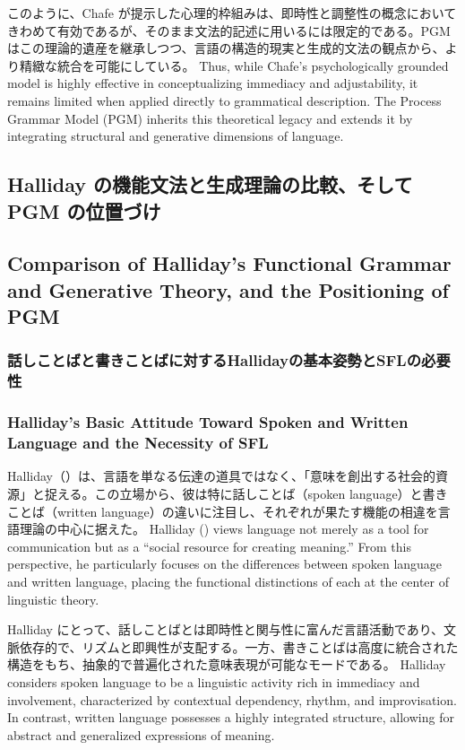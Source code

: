 \ifJPN
このように、Chafe が提示した心理的枠組みは、即時性と調整性の概念においてきわめて有効であるが、そのまま文法的記述に用いるには限定的である。PGM はこの理論的遺産を継承しつつ、言語の構造的現実と生成的文法の観点から、より精緻な統合を可能にしている。
\else
Thus, while Chafe's psychologically grounded model is highly effective in conceptualizing immediacy and adjustability, it remains limited when applied directly to grammatical description. The Process Grammar Model (PGM) inherits this theoretical legacy and extends it by integrating structural and generative dimensions of language.
\fi

\ifJPN
\subsection{Halliday の機能文法と生成理論の比較、そして PGM の位置づけ}
\else
\subsection{Comparison of Halliday's Functional Grammar and Generative Theory, and the Positioning of PGM}
\fi

\ifJPN
\subsubsection{話しことばと書きことばに対するHallidayの基本姿勢とSFLの必要性}
\else
\subsubsection{Halliday's Basic Attitude Toward Spoken and Written Language and the Necessity of SFL}
\fi

\ifJPN
Halliday（\textcite{halliday1994spoken}）は、言語を単なる伝達の道具ではなく、「意味を創出する社会的資源」と捉える。この立場から、彼は特に話しことば（spoken language）と書きことば（written language）の違いに注目し、それぞれが果たす機能の相違を言語理論の中心に据えた。
\else
  Halliday (\textcite{halliday1994spoken}) views language not merely as a tool for communication but as a ``social resource for creating meaning.'' From this perspective, he particularly focuses on the differences between spoken language and written language, placing the functional distinctions of each at the center of linguistic theory.
\fi

\ifJPN
Halliday にとって、話しことばとは即時性と関与性に富んだ言語活動であり、文脈依存的で、リズムと即興性が支配する。一方、書きことばは高度に統合された構造をもち、抽象的で普遍化された意味表現が可能なモードである。
\else
Halliday considers spoken language to be a linguistic activity rich in immediacy and involvement, characterized by contextual dependency, rhythm, and improvisation. In contrast, written language possesses a highly integrated structure, allowing for abstract and generalized expressions of meaning.
\fi


